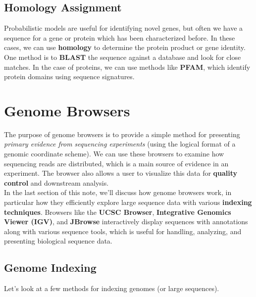 \documentclass[12pt]{article}
\begin{document}
\subsection{Homology Assignment}
Probabilistic models are useful for identifying novel genes, but often we have a sequence for a gene or protein which has been characterized before. In these cases, we can use \textbf{homology} to determine the protein product or gene identity. One method is to \textbf{BLAST} the sequence against a database and look for close matches. In the case of proteins, we can use methods like \textbf{PFAM}, which identify protein domains using sequence signatures. 

\section{Genome Browsers}
The purpose of genome browsers is to provide a simple method for presenting \textit{primary evidence from sequencing experiments} (using the logical format of a genomic coordinate scheme). We can use these browsers to examine how sequencing reads are distributed, which is a main source of evidence in an experiment. The browser also allows a user to visualize this data for \textbf{quality control} and downstream analysis.\\[10pt]
In the last section of this note, we'll discuss how genome browsers work, in particular how they efficiently explore large sequence data with various \textbf{indexing techniques}. Browsers like the \textbf{UCSC Browser}, \textbf{Integrative Genomics Viewer (IGV)}, and \textbf{JBrowse} interactively display sequences with annotations along with various sequence tools, which is useful for handling, analyzing, and presenting biological sequence data.
\subsection{Genome Indexing}
Let's look at a few methods for indexing genomes (or large sequences).
\end{document}
